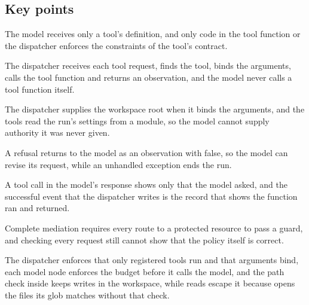 \subsection*{Key points}
\bi
\item The model receives only a tool's definition, and only code in the tool function or the
dispatcher enforces the constraints of the tool's contract.
\item The dispatcher receives each tool request, finds the tool, binds the arguments, calls the tool
function and returns an observation, and the model never calls a tool function itself.
\item The dispatcher supplies the workspace root when it binds the arguments, and the tools read the
run's settings from a module, so the model cannot supply authority it was never given.
\item A refusal returns to the model as an observation with  false, so the model can
revise its request, while an unhandled exception ends the run.
\item A tool call in the model's response shows only that the model asked, and the successful
 event that the dispatcher writes is the record that shows the function ran
and returned.
\item Complete mediation requires every route to a protected resource to pass a guard, and checking
every request still cannot show that the policy itself is correct.
\item The dispatcher enforces that only registered tools run and that arguments bind, each model node
enforces the budget before it calls the model, and the path check inside  keeps writes
in the workspace, while reads escape it because  opens the files its glob matches
without that check.
\ei
